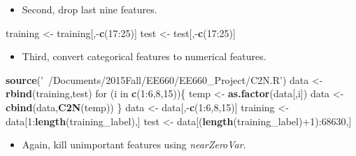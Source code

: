 \documentclass[]{article}
\newenvironment{Shaded}{\begin{snugshade}}{\end{snugshade}}
\newcommand{\KeywordTok}[1]{\textcolor[rgb]{0.13,0.29,0.53}{\textbf{{#1}}}}
\newcommand{\DecValTok}[1]{\textcolor[rgb]{0.00,0.00,0.81}{{#1}}}
\newcommand{\StringTok}[1]{\textcolor[rgb]{0.31,0.60,0.02}{{#1}}}
\newcommand{\NormalTok}[1]{{#1}}
\begin{document}
\begin{itemize}
\itemsep1pt\parskip0pt
\item
  Second, drop last nine features.
\end{itemize}

\begin{Shaded}
\begin{Highlighting}[]
\NormalTok{training <-}\StringTok{ }\NormalTok{training[,-}\KeywordTok{c}\NormalTok{(}\DecValTok{17}\NormalTok{:}\DecValTok{25}\NormalTok{)]}
\NormalTok{test <-}\StringTok{ }\NormalTok{test[,-}\KeywordTok{c}\NormalTok{(}\DecValTok{17}\NormalTok{:}\DecValTok{25}\NormalTok{)]}
\end{Highlighting}
\end{Shaded}

\begin{itemize}
\itemsep1pt\parskip0pt
\item
  Third, convert categorical features to numerical features.
\end{itemize}

\begin{Shaded}
\begin{Highlighting}[]
\KeywordTok{source}\NormalTok{(}\StringTok{'~/Documents/2015Fall/EE660/EE660_Project/C2N.R'}\NormalTok{)}
\NormalTok{data <-}\StringTok{ }\KeywordTok{rbind}\NormalTok{(training,test)}
\NormalTok{for (i in }\KeywordTok{c}\NormalTok{(}\DecValTok{1}\NormalTok{:}\DecValTok{6}\NormalTok{,}\DecValTok{8}\NormalTok{,}\DecValTok{15}\NormalTok{))\{}
    \NormalTok{temp <-}\StringTok{ }\KeywordTok{as.factor}\NormalTok{(data[,i])}
    \NormalTok{data <-}\StringTok{ }\KeywordTok{cbind}\NormalTok{(data,}\KeywordTok{C2N}\NormalTok{(temp))}
\NormalTok{\}}
\NormalTok{data <-}\StringTok{ }\NormalTok{data[,-}\KeywordTok{c}\NormalTok{(}\DecValTok{1}\NormalTok{:}\DecValTok{6}\NormalTok{,}\DecValTok{8}\NormalTok{,}\DecValTok{15}\NormalTok{)]}
\NormalTok{training <-}\StringTok{ }\NormalTok{data[}\DecValTok{1}\NormalTok{:}\KeywordTok{length}\NormalTok{(training_label),]}
\NormalTok{test <-}\StringTok{ }\NormalTok{data[(}\KeywordTok{length}\NormalTok{(training_label)+}\DecValTok{1}\NormalTok{):}\DecValTok{68630}\NormalTok{,]}
\end{Highlighting}
\end{Shaded}

\begin{itemize}
\itemsep1pt\parskip0pt
\item
  Again, kill unimportant features using \emph{nearZeroVar}.
\end{itemize}
\end{document}
